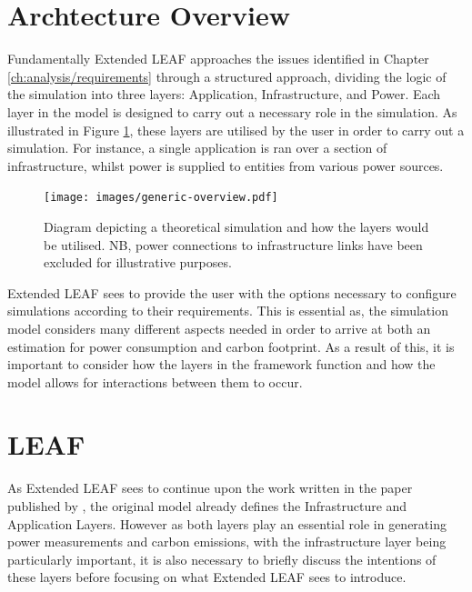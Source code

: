 \documentclass{l4proj}
\begin{document}

\section{Archtecture Overview}\label{sec:architecture-overview}
Fundamentally Extended LEAF approaches the issues identified in Chapter \ref{ch:analysis/requirements} through a structured approach, dividing the logic of the simulation into three layers: Application, Infrastructure, and Power.
Each layer in the model is designed to carry out a necessary role in the simulation.
As illustrated in Figure \ref{fig:generic-overview}, these layers are utilised by the user in order to carry out a simulation.
For instance, a single application is ran over a section of infrastructure, whilst power is supplied to entities from various power sources.

\begin{figure}[htbp]
    \centering
    \texttt{[image: images/generic-overview.pdf]}
    ~
    \caption{Diagram depicting a theoretical simulation and how the layers would be utilised. NB, power connections to infrastructure links have been excluded for illustrative purposes.}
    \label{fig:generic-overview}
\end{figure}

Extended LEAF sees to provide the user with the options necessary to configure simulations according to their requirements.
This is essential as, the simulation model considers many different aspects needed in order to arrive at both an estimation for power consumption and carbon footprint.
As a result of this, it is important to consider how the layers in the framework function and how the model allows for interactions between them to occur.

\section{LEAF}\label{sec:LEAF}
As Extended LEAF sees to continue upon the work written in the paper published by \cite{leaf2021}, the original model already defines the Infrastructure and Application Layers.
However as both layers play an essential role in generating power measurements and carbon emissions, with the infrastructure layer being particularly important, it is also necessary to briefly discuss the intentions of these layers before focusing on what Extended LEAF sees to introduce.
\end{document}
